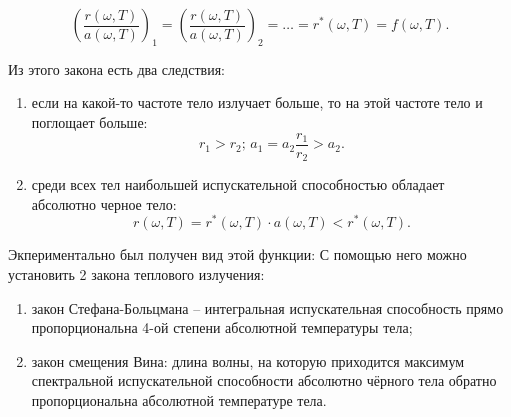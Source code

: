\[
    \left(\frac{r(\omega, T)}{a(\omega, T)}\right)_1 =
    \left(\frac{r(\omega, T)}{a(\omega, T)}\right)_2 =
    \ldots = r^*(\omega, T) = f(\omega, T).
\]

Из этого закона есть два следствия:
\begin{enumerate}
    \item если на какой-то частоте тело излучает больше, то на этой частоте тело
        и поглощает больше:
        \[
            r_1 > r_2;\, a_1 = a_2\frac{r_1}{r_2} > a_2.
        \]
    \item среди всех тел наибольшей испускательной способностью обладает
        абсолютно черное тело:
        \[
            r(\omega, T) = r^*(\omega, T)\cdot a(\omega, T) < r^*(\omega, T).
        \]
\end{enumerate}

Экпериментально был получен вид этой функции:
С помощью него можно установить 2 закона теплового излучения:
\begin{enumerate}
    \item закон Стефана-Больцмана -- интегральная испускательная способность
        прямо пропорциональна 4-ой степени абсолютной температуры тела;
    \item закон смещения Вина: длина волны, на которую приходится максимум
        спектральной испускательной способности абсолютно чёрного тела обратно
        пропорциональна абсолютной температуре тела.
\end{enumerate}

